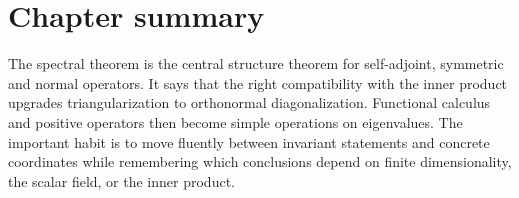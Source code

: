 \section*{Chapter summary}
The spectral theorem is the central structure theorem for self-adjoint, symmetric and normal operators. It says that the right compatibility with the inner product upgrades triangularization to orthonormal diagonalization. Functional calculus and positive operators then become simple operations on eigenvalues.
The important habit is to move fluently between invariant statements and concrete coordinates while remembering which conclusions depend on finite dimensionality, the scalar field, or the inner product.

